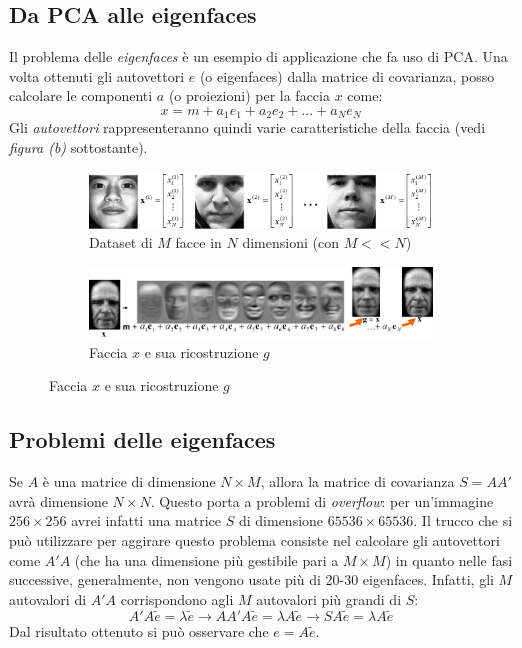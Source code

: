 \documentclass[a4paper,oneside,titlepage]{book}
\begin{document}
\subsection{Da PCA alle eigenfaces}
Il problema delle \textit{eigenfaces} è un esempio di applicazione che fa uso di PCA. Una volta ottenuti gli autovettori $e$ (o eigenfaces) dalla matrice di covarianza, posso calcolare le componenti $a$ (o proiezioni) per la faccia $x$ come:
\[ x = m + a_1 e_1 + a_2 e_2 + ... + a_N e_N \]
Gli \textit{autovettori} rappresenteranno quindi varie caratteristiche della faccia (vedi \textit{figura (b)} sottostante).
\begin{figure}[htp]
	\begin{subfigure}{0.49\textwidth}
	    \centering
		\includegraphics[width=\textwidth, height=\textheight, keepaspectratio]{eigenfaces.png}
		\caption{Dataset di $M$ facce in $N$ dimensioni (con $M << N$)}
	\end{subfigure}
	\hfill
	\begin{subfigure}{0.49\textwidth}
	    \centering
		\includegraphics[width=\textwidth, height=\textheight, keepaspectratio]{reconstruction.png}
		\caption{Faccia $x$ e sua ricostruzione $g$}
	\end{subfigure}
\end{figure}

\subsection{Problemi delle eigenfaces}
Se $A$ è una matrice di dimensione $N \times M$, allora la matrice di covarianza $S = A A'$ avrà dimensione $N \times N$. Questo porta a problemi di \textit{overflow}: per un'immagine $256 \times 256$ avrei infatti una matrice $S$ di dimensione $65536 \times 65536$. Il trucco che si può utilizzare per aggirare questo problema consiste nel calcolare gli autovettori come $A' A$ (che ha una dimensione più gestibile pari a $M \times M$) in quanto nelle fasi successive, generalmente, non vengono usate più di 20-30 eigenfaces. Infatti, gli $M$ autovalori di $A' A$ corrispondono agli $M$ autovalori più grandi di $S$:
\[ A' A \tilde{e} = \lambda \tilde{e} \rightarrow A A' A \tilde{e} = \lambda A \tilde{e} \rightarrow S A \tilde{e} = \lambda A \tilde{e} \]
Dal risultato ottenuto si può osservare che $e = A \tilde{e}$.
\end{document}

